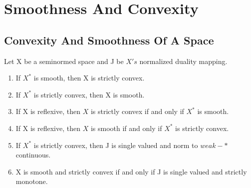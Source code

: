 \chapter{Smoothness And Convexity}
\label{ch:thisChapterLabel}
\section{Convexity And Smoothness Of A Space}
\begin{prop}
Let X be a seminormed space and J be $X's$ normalized duality mapping. 
\begin{enumerate} 
\item If $X^*$ is smooth, then X is strictly convex.
\item If $X^*$ is strictly convex, then X is smooth. 
\item If X is reflexive, then $X$ is strictly convex if and only if $X^*$ is smooth. 
\item If X is reflexive, then $X$ is smooth if and only if $X^*$ is strictly convex. 
\item If $X^*$ is strictly convex, then J is single valued and norm to $weak-*$ continuous. 
\item X is smooth and strictly convex if and only if J is single valued and strictly monotone. 
\end{enumerate} 
\end{prop} 

